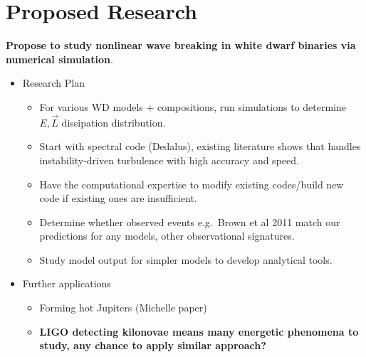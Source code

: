 \documentclass[11pt,
        usenames, %
        dvipsnames %
    ]{article}
\begin{document}
\section{Proposed Research}

\textbf{Propose to study nonlinear wave breaking in white dwarf binaries via
numerical simulation}.

\begin{itemize}
    \item Research Plan
        \begin{itemize}
            \item For various WD models + compositions, run simulations to
                determine $E, \vec{L}$ dissipation distribution.
            \item Start with spectral code (Dedalus), existing literature shows
                that handles instability-driven turbulence with high accuracy
                and speed.
            \item Have the computational expertise to modify existing
                codes/build new code if existing ones are insufficient.
            \item Determine whether observed events e.g.\ Brown et al 2011 match
                our predictions for any models, other observational signatures.
            \item Study model output for simpler models to develop analytical
                tools.
        \end{itemize}
    \item Further applications
        \begin{itemize}
            \item Forming hot Jupiters (Michelle paper)
            \item \textbf{LIGO detecting kilonovae means many energetic
                phenomena to study, any chance to apply similar approach?}
        \end{itemize}
\end{itemize}
\end{document}
